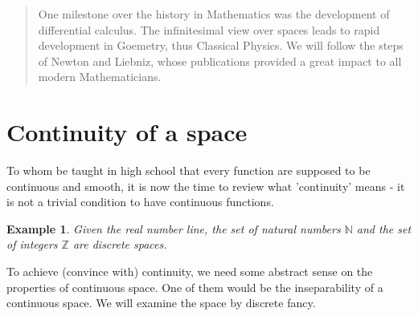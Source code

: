 \documentclass[12pt]{article}
\newtheorem*{example}{Example}
\begin{document}
    \begin{abstract}
        One milestone over the history in Mathematics was the development of differential calculus. The infinitesimal view over spaces leads to rapid development in Goemetry, thus Classical Physics. We will follow the steps of Newton and Liebniz, whose publications provided a great impact to all modern Mathematicians.
    \end{abstract}

    \section{Continuity of a space}

    To whom be taught in high school that every function are supposed to be continuous and smooth, it is now the time to review what 'continuity' means - it is not a trivial condition to have continuous functions.

    \begin{example}
        Given the real number line, the set of natural numbers $\mathbb{N}$ and the set of integers $\mathbb{Z}$ are discrete spaces.
    \end{example}

    To achieve (convince with) continuity, we need some abstract sense on the properties of continuous space. One of them would be the inseparability of a continuous space. We will examine the space by discrete fancy.

    
\end{document}
